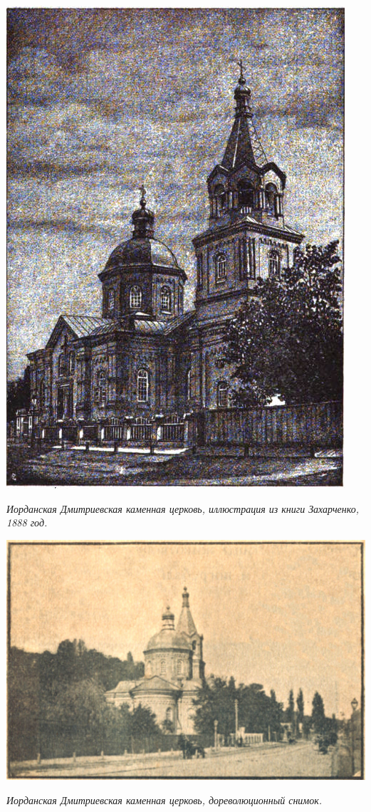 \begin{center}
\includegraphics[width=0.90\linewidth]{chast-kirvys/lys02/1888-zaharchenko-iordan.jpg}

\textit{Иорданская Дмитриевская каменная церковь, иллюстрация из книги Захарченко, 1888 год.}
\end{center}


\begin{center}
\includegraphics[width=\linewidth]{chast-kirvys/lys02/iordanskaja_cerkov.jpg}

\textit{Иорданская Дмитриевская каменная церковь, дореволюционный снимок.}
\end{center}

